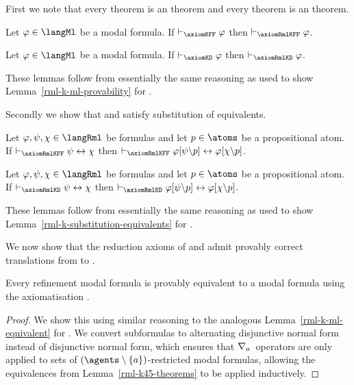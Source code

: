 First we note that every \axiomKFF{} theorem is an \axiomRmlKFF{} theorem and every \axiomKD{} theorem is an \axiomRmlKD{} theorem.

\begin{lemma}\label{rml-k45-ml-provability}
Let $\phi \in \langMl$ be a modal formula.
If $\proves_\axiomKFF \phi$ then $\proves_\axiomRmlKFF \phi$.
\end{lemma}

\begin{lemma}\label{rml-kd45-ml-provability}
Let $\phi \in \langMl$ be a modal formula.
If $\proves_\axiomKD \phi$ then $\proves_\axiomRmlKD \phi$.
\end{lemma}

These lemmas follow from essentially the same reasoning as used to show Lemma~\ref{rml-k-ml-provability} for \axiomRmlK{}.

Secondly we show that \axiomRmlKFF{} and \axiomRmlKD{} satisfy substitution of equivalents.

\begin{lemma}\label{rml-k45-substitution-equivalents}
Let $\phi, \psi, \chi \in \langRml$ be formulas and let $\atomP \in \atoms$ be a propositional atom.
If $\proves_\axiomRmlKFF \psi \iff \chi$ then $\proves_\axiomRmlKFF \phi[\psi\backslash\atomP] \iff \phi[\chi\backslash\atomP]$.
\end{lemma}

\begin{lemma}\label{rml-kd45-substitution-equivalents}
Let $\phi, \psi, \chi \in \langRml$ be formulas and let $\atomP \in \atoms$ be a propositional atom.
If $\proves_\axiomRmlKD \psi \iff \chi$ then $\proves_\axiomRmlKD \phi[\psi\backslash\atomP] \iff \phi[\chi\backslash\atomP]$.
\end{lemma}

These lemmas follow from essentially the same reasoning as used to show Lemma~\ref{rml-k-substitution-equivalents} for \axiomRmlK{}.

We now show that the reduction axioms of \logicRmlKFF{} and \logicRmlKD{} admit provably correct translations from \langRml{} to \langMl{}.

\begin{lemma}\label{rml-k45-ml-equivalent}
Every refinement modal formula is provably equivalent to a modal formula using the axiomatisation \axiomRmlKFF{}.
\end{lemma}

\begin{proof}
We show this using similar reasoning to the analogous Lemma~\ref{rml-k-ml-equivalent} for \axiomRmlK{}.
We convert subformulas to alternating disjunctive normal form instead of disjunctive normal form, which ensures that $\nabla_{a}$~operators are only applied to sets of $(\agents \setminus \{\agentA\})$-restricted modal formulas, allowing the equivalences from Lemma~\ref{rml-k45-theorems} to be applied inductively.
\end{proof}

